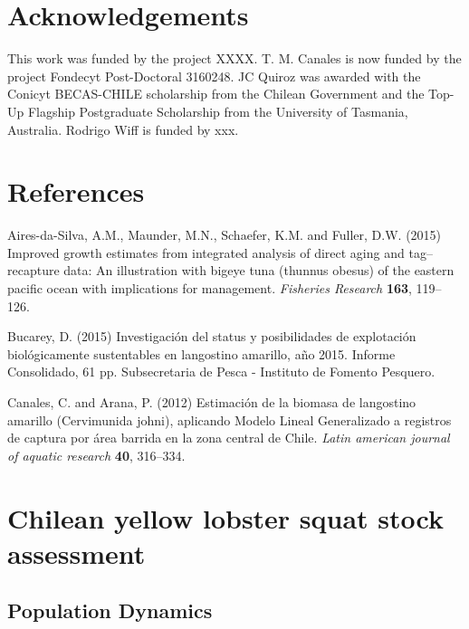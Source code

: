 \documentclass[11pt,letterpaper,]{article}
\begin{document}
\section{Acknowledgements}\label{acknowledgements}

This work was funded by the project XXXX. T. M. Canales is now funded by
the project Fondecyt Post-Doctoral 3160248. JC Quiroz was awarded with
the Conicyt BECAS-CHILE scholarship from the Chilean Government and the
Top-Up Flagship Postgraduate Scholarship from the University of
Tasmania, Australia. Rodrigo Wiff is funded by xxx.

\section{References}\label{references}

\setlength{\parindent}{0cm} \fontsize{9}{10}\selectfont
\setlength{\parskip}{0.8em}

\hypertarget{refs}{}
\hypertarget{ref-aires2015improved}{}
Aires-da-Silva, A.M., Maunder, M.N., Schaefer, K.M. and Fuller, D.W.
(2015) Improved growth estimates from integrated analysis of direct
aging and tag--recapture data: An illustration with bigeye tuna (thunnus
obesus) of the eastern pacific ocean with implications for management.
\emph{Fisheries Research} \textbf{163}, 119--126.

\hypertarget{ref-bucarey2015}{}
Bucarey, D. (2015) Investigación del status y posibilidades de
explotación biológicamente sustentables en langostino amarillo, año
2015. Informe Consolidado, 61 pp. Subsecretaria de Pesca - Instituto de
Fomento Pesquero.

\hypertarget{ref-canalesArana2012}{}
Canales, C. and Arana, P. (2012) Estimación de la biomasa de langostino
amarillo (Cervimunida johni), aplicando Modelo Lineal Generalizado a
registros de captura por área barrida en la zona central de Chile.
\emph{Latin american journal of aquatic research} \textbf{40}, 316--334.

\setlength{\parindent}{25pt}
\setlength{\parskip}{0em}
\fontsize{11}{14}\selectfont

\clearpage

\appendix
\section{Chilean yellow lobster squat stock assessment} \label{app:model}
\subsection{Population Dynamics}
\end{document}
